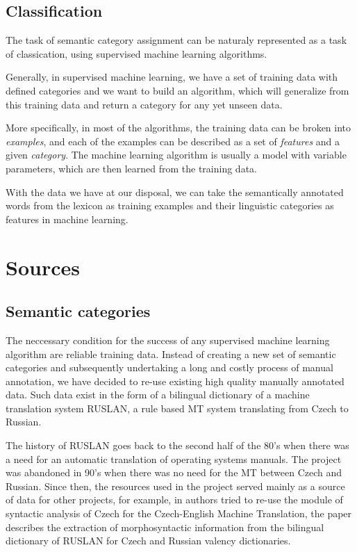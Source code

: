 \documentclass[letterpaper]{article}
\begin{document}
\subsection{Classification}
The task of semantic category assignment can be naturaly represented as a task of classication, using supervised machine learning algorithms.

Generally, in supervised machine learning, we have a set of training data with defined 
categories and we want to build an algorithm, which will generalize from this training data and return a category for any yet unseen data.

More specifically, in most of the algorithms, the training data can be broken into
\textit{examples}, and each of the examples can be described as a set of \textit{features} and a given \textit{category}. The machine learning algorithm is usually a model with variable parameters, which are then learned from the training data.

With the data we have at our disposal, we can take the semantically annotated words from the lexicon as training examples 
and their linguistic categories as features in machine learning.


\section{Sources}
\subsection{Semantic categories}
The neccessary condition for the success of any supervised machine learning algorithm are reliable training data. Instead of creating a new set of semantic categories and subsequently undertaking a long and costly process of manual annotation, we have decided to re-use existing high quality manually annotated data. Such data exist in the form of a bilingual dictionary of a machine translation system RUSLAN, a rule based MT system translating from Czech to Russian.

The history of RUSLAN \cite{oliva1989parser} goes back to the second half of the 80's when there was a need for an automatic translation of operating systems manuals. The project was abandoned in 90's when
there was no need for the MT between Czech and Russian. Since then, the resources used in the project served mainly as a source of data for other projects, for
example, in \cite{mt-recycled} authors tried to re-use the module
of syntactic analysis of Czech for the Czech-English Machine Translation,
the paper \cite{pisa2010} describes the extraction of morphosyntactic information from the bilingual dictionary of RUSLAN for Czech and Russian valency dictionaries.
\end{document}
